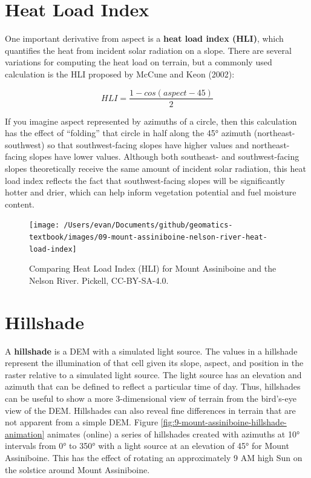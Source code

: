 \documentclass[
]{book}
\begin{document}
\hypertarget{heat-load-index}{%
\section{Heat Load Index}\label{heat-load-index}}

One important derivative from aspect is a \textbf{heat load index (HLI)}, which quantifies the heat from incident solar radiation on a slope. There are several variations for computing the heat load on terrain, but a commonly used calculation is the HLI proposed by McCune and Keon (2002):

\[
HLI=\frac{1-cos(aspect-45)}{2}
\]

If you imagine aspect represented by azimuths of a circle, then this calculation has the effect of ``folding'' that circle in half along the 45° azimuth (northeast-southwest) so that southwest-facing slopes have higher values and northeast-facing slopes have lower values. Although both southeast- and southwest-facing slopes theoretically receive the same amount of incident solar radiation, this heat load index reflects the fact that southwest-facing slopes will be significantly hotter and drier, which can help inform vegetation potential and fuel moisture content.

\begin{figure}
\texttt{[image: /Users/evan/Documents/github/geomatics-textbook/images/09-mount-assiniboine-nelson-river-heat-load-index]} \caption{Comparing Heat Load Index (HLI) for Mount Assiniboine and the Nelson River. Pickell, CC-BY-SA-4.0.}\label{fig:9-mount-assiniboine-nelson-river-heat-load-index}
\end{figure}

\hypertarget{hillshade}{%
\section{Hillshade}\label{hillshade}}

A \textbf{hillshade} is a DEM with a simulated light source. The values in a hillshade represent the illumination of that cell given its slope, aspect, and position in the raster relative to a simulated light source. The light source has an elevation and azimuth that can be defined to reflect a particular time of day. Thus, hillshades can be useful to show a more 3-dimensional view of terrain from the bird's-eye view of the DEM. Hillshades can also reveal fine differences in terrain that are not apparent from a simple DEM. Figure \ref{fig:9-mount-assiniboine-hillshade-animation} animates (online) a series of hillshades created with azimuths at 10° intervals from 0° to 350° with a light source at an elevation of 45° for Mount Assiniboine. This has the effect of rotating an approximately 9 AM high Sun on the solstice around Mount Assiniboine.
\end{document}
